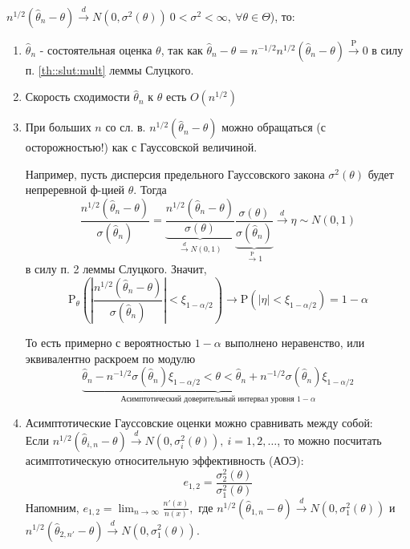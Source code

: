\documentclass[12pt]{article}
\theoremstyle{basic_theorem}
\theoremstyle{name_theorem}
\def\P{
    \mathrm{P}
}
\begin{document}
$n^{1/2}(\hat{\theta}_n - \theta) \xrightarrow{d} N(0, \sigma^2(\theta)) \ 0 < \sigma^2 < \infty,\ \forall \theta \in \Theta$), то: \begin{enumerate}

    \item $\hat{\theta}_n$ - состоятельная оценка $\theta$, так как $\hat{\theta}_n - \theta = n^{-1/2} n^{1/2}(\hat{\theta}_n - \theta) \xrightarrow{\P} 0$ 
        в силу п. \ref{th::slut:mult} леммы Слуцкого.
    \item Скорость сходимости $\hat{\theta}_n$ к $\theta$ есть $O(n^{1/2})$
    \item При больших $n$ со сл. в. $n^{1/2}(\hat{\theta}_n - \theta)$ можно обращаться (с осторожностью!) как с Гауссовской величиной. 
        
    Например, пусть дисперсия предельного Гауссовского закона $\sigma^2(\theta)$ будет непреревной ф-цией $\theta$. Тогда
        $$ \frac{n^{1/2}(\hat{\theta}_n - \theta)}{\sigma(\hat{\theta}_n)} =
        \underbrace{\frac{n^{1/2}(\hat{\theta}_n - \theta)}{\sigma(\theta)}}_{\xrightarrow{d} N(0, 1)}
        \underbrace{\frac{\sigma(\theta)}{\sigma(\hat{\theta}_n)}}_{\xrightarrow{\P} 1} \xrightarrow{d} \eta \sim N(0, 1)$$
        в силу п. 2 леммы Слуцкого. Значит,
        $$\P_\theta (|\frac{n^{1/2}(\hat{\theta}_n - \theta)}{\sigma(\hat{\theta}_n)}| < \xi_{1 - \alpha/2}) \rightarrow \P(|\eta| < \xi_{1 - \alpha/2}) = 1 - \alpha$$

        То есть примерно с вероятностью $1 - \alpha$ выполнено неравенство, или эквивалентно раскроем по модулю
        $$\underbrace{\hat{\theta}_n - n^{-1/2}\sigma(\hat{\theta}_n)\xi_{1 - \alpha /2} < \theta < \hat{\theta}_n + n^{-1/2}\sigma(\hat{\theta}_n)\xi_{1 - \alpha /2}}_{\mbox{Асимптотический доверительный интервал уровня $1 - \alpha$}}$$

    \item Асимптотические Гауссовские оценки можно сравнивать между собой: \\
    Если $n^{1/2} (\hat{\theta}_{i,n} - \theta) \xrightarrow{d} N(0, \sigma^2_{i}(\theta)),\ i = 1, 2, \ldots$, то
    можно посчитать асимптотическую относительную эффективность (АОЭ): 
    $$e_{1,2} = \frac{\sigma_2^2(\theta)}{\sigma_1^2(\theta)}$$
    Напомним, $e_{1, 2} = \lim_{n \to \infty} \frac{n'(x)}{n (x)}, \mbox{ где }
    n^{1/2}(\hat{\theta}_{1,n} - \theta) \xrightarrow{d} N(0, \sigma_1^2(\theta))$
    и $n^{1/2}(\hat{\theta}_{2,n'} - \theta) \xrightarrow{d} N(0, \sigma_1^2(\theta))$.
\end{enumerate}
\end{document}
